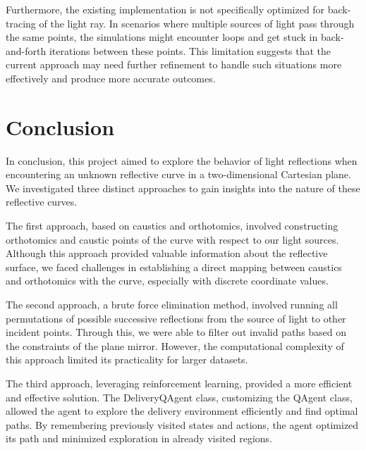 \documentclass[12pt,a4paper,twoside]{report}
\begin{document}
Furthermore, the existing implementation is not specifically optimized for back-tracing of the light ray. In scenarios where multiple sources of light pass through the same points, the simulations might encounter loops and get stuck in back-and-forth iterations between these points. This limitation suggests that the current approach may need further refinement to handle such situations more effectively and produce more accurate outcomes.
\newpage
\section{Conclusion}
\justifying

In conclusion, this project aimed to explore the behavior of light reflections when encountering an unknown reflective curve in a two-dimensional Cartesian plane. We investigated three distinct approaches to gain insights into the nature of these reflective curves.

The first approach, based on caustics and orthotomics, involved constructing orthotomics and caustic points of the curve with respect to our light sources. Although this approach provided valuable information about the reflective surface, we faced challenges in establishing a direct mapping between caustics and orthotomics with the curve, especially with discrete coordinate values.

The second approach, a brute force elimination method, involved running all permutations of possible successive reflections from the source of light to other incident points. Through this, we were able to filter out invalid paths based on the constraints of the plane mirror. However, the computational complexity of this approach limited its practicality for larger datasets.

The third approach, leveraging reinforcement learning, provided a more efficient and effective solution. The DeliveryQAgent class, customizing the QAgent class, allowed the agent to explore the delivery environment efficiently and find optimal paths. By remembering previously visited states and actions, the agent optimized its path and minimized exploration in already visited regions.
\end{document}
